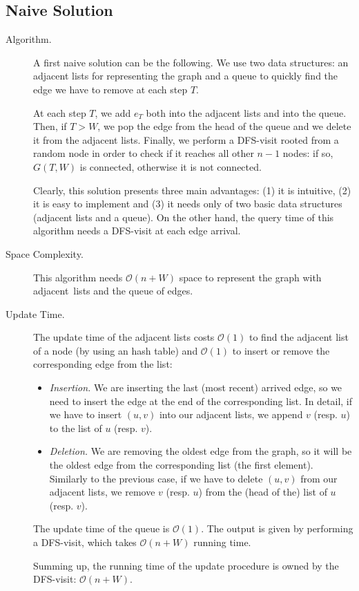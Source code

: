\documentclass[12pt,a4paper]{article}
\begin{document}
\subsection*{Naive Solution}
\begin{description}
\item[Algorithm.] A first naive solution can be the following. We use two data structures: an adjacent lists for representing the graph and a queue to quickly find the edge we have to remove at each step $T$.

At each step $T$, we add $e_T$ both into the adjacent lists and into the queue. Then, if $T > W$, we pop the edge from the head of the queue and we delete it from the adjacent lists. Finally, we perform a DFS-visit rooted from a random node in order to check if it reaches all other $n - 1$ nodes: if so,  $G(T, W)$ is connected, otherwise it is not connected.

Clearly, this solution presents three main advantages: (1) it is intuitive, (2) it is easy to implement and (3) it needs only of two basic data structures (adjacent lists and a queue). On the other hand, the query time of this algorithm needs a DFS-visit at each edge arrival.


\item[Space Complexity.] This algorithm needs $\mathcal{O}(n + W)$ space to represent the graph with adjacent~lists and the queue of edges.

\item[Update Time.] The update time of the adjacent lists costs $\mathcal{O}(1)$ to find the adjacent list of a node (by using an hash table) and $\mathcal{O}(1)$ to insert or remove the corresponding edge from the list:
\begin{itemize}
\item \textit{Insertion.} We are inserting the last (most recent) arrived edge, so we need to insert the edge at the end of the corresponding list. In detail, if we have to insert $(u, v)$ into our adjacent lists, we append $v$ (resp. $u$) to the list of $u$ (resp. $v$).
\item \textit{Deletion.} We are removing the oldest edge from the graph, so it will be the oldest edge from the corresponding list (the first element).  Similarly to the previous case, if we have to delete $(u, v)$ from our adjacent lists, we remove $v$ (resp. $u$) from the (head of the) list of $u$ (resp. $v$).
\end{itemize}

The update time of the queue is $\mathcal{O}(1)$. The output is given by performing a DFS-visit, which takes $\mathcal{O}(n + W)$ running time.

Summing up, the running time of the update procedure is owned by the DFS-visit: $\mathcal{O}(n + W)$.
\end{description}
\end{document}
